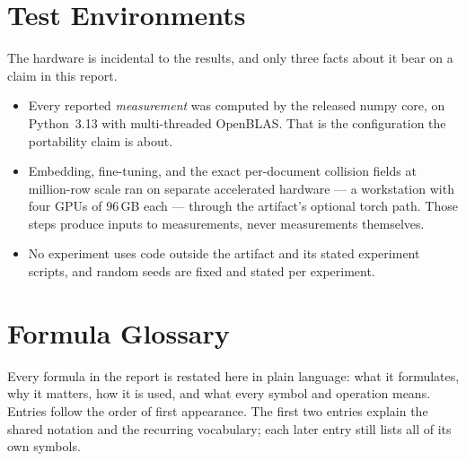 \documentclass[11pt,letterpaper]{article}
\begin{document}
\section{Test Environments}
\label{app:env}

The hardware is incidental to the results, and only three facts about it
bear on a claim in this report.

\begin{itemize}
\item Every reported \emph{measurement} was computed by the released
  \textsf{numpy} core, on Python~3.13 with multi-threaded OpenBLAS. That
  is the configuration the portability claim is about.
\item Embedding, fine-tuning, and the exact per-document collision
  fields at million-row scale ran on separate accelerated hardware --- a
  workstation with four GPUs of $96$\,GB each --- through the artifact's
  optional \textsf{torch} path. Those steps produce inputs to
  measurements, never measurements themselves.
\item No experiment uses code outside the artifact and its stated
  experiment scripts, and random seeds are fixed and stated per
  experiment.
\end{itemize}

\section{Formula Glossary}
\label{app:glossary}

Every formula in the report is restated here in plain language: what it
formulates, why it matters, how it is used, and what every symbol and
operation means. Entries follow the order of first appearance. The first
two entries explain the shared notation and the recurring vocabulary; each
later entry still lists all of its own symbols.
\end{document}
